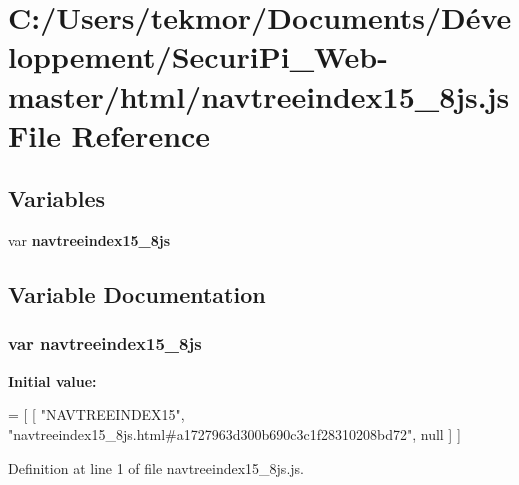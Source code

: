\section{C\+:/\+Users/tekmor/\+Documents/\+Développement/\+Securi\+Pi\+\_\+\+Web-\/master/html/navtreeindex15\+\_\+8js.js File Reference}
\label{navtreeindex15__8js_8js}
\subsection*{Variables}
\begin{DoxyCompactItemize}
\item 
var {\bf navtreeindex15\+\_\+8js}
\end{DoxyCompactItemize}


\subsection{Variable Documentation}
\subsubsection[{navtreeindex15\+\_\+8js}]{\setlength{\rightskip}{0pt plus 5cm}var navtreeindex15\+\_\+8js}\label{navtreeindex15__8js_8js_afae27f47a7d4adb1d28fd62ed28fe9ef}
{\bfseries Initial value\+:}
\begin{DoxyCode}
=
[
    [ \textcolor{stringliteral}{"NAVTREEINDEX15"}, \textcolor{stringliteral}{"navtreeindex15\_8js.html#a1727963d300b690c3c1f28310208bd72"}, null ]
]
\end{DoxyCode}


Definition at line 1 of file navtreeindex15\+\_\+8js.\+js.

